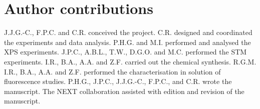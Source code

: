 \documentclass[aps,prl,reprint,longbibliography,superscriptaddress, english]{revtex4-1}
\begin{document}
\section{Author contributions}
J.J.G.-C., F.P.C. and C.R. conceived the project. C.R. designed and coordinated the experiments and data analysis. P.H.G. and M.I. performed and analysed the XPS experiments. J.P.C., A.B.L., T.W., D.G.O. and M.C. performed the STM experiments. I.R., B.A., A.A. and Z.F. carried out the chemical synthesis. R.G.M. I.R., B.A., A.A. and Z.F. performed the characterisation in solution of fluorescence studies. P.H.G., J.P.C., J.J.G.-C., F.P.C., and C.R. wrote the manuscript. The NEXT collaboration assisted with edition and revision of the manuscript. 

 

\end{document}
